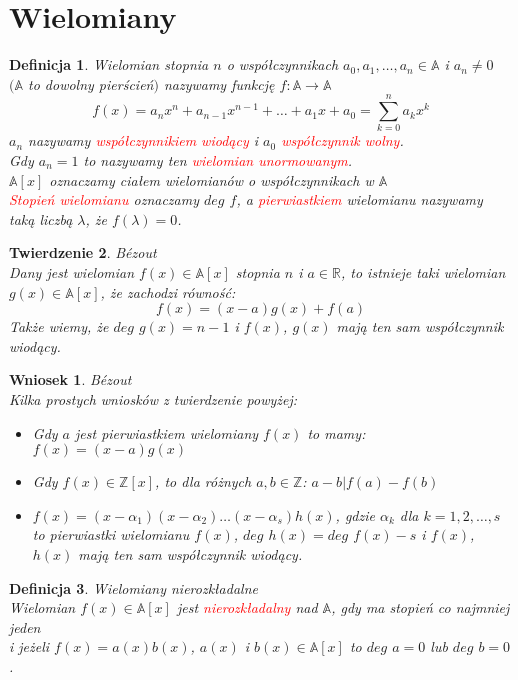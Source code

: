 \documentclass[10pt,a4paper]{article}
\newtheorem{theorem}{Twierdzenie}[section]
\newtheorem{corollary}{Wniosek}[theorem]
\newtheorem{defi}[theorem]{Definicja}
\newcommand{\Z}{\mathbb{Z}}
\newcommand{\R}{\mathbb{R}}
\newcommand{\A}{\mathbb{A}}
\begin{document}
\section{Wielomiany}
\begin{defi}
\color{black}
	Wielomian stopnia $n$ o współczynnikach $a_0,a_1,\ldots,a_n \in \A$ i $a_n \neq 0$ \\ $(\A$ to dowolny pierścień$)$ nazywamy funkcję $f:\A \rightarrow \A$
	$$f(x)=a_nx^n+a_{n-1}x^{n-1}+\ldots+a_1x+a_0 = \sum_{k=0}^{n}a_kx^k$$
	$a_n$ nazywamy \textcolor{red}{współczynnikiem wiodący} i $a_0$ \textcolor{red}{współczynnik wolny}. 
	\\ Gdy $a_n=1$ to nazywamy ten \textcolor{red}{wielomian unormowanym}.  
	\\ $\A[x]$ oznaczamy ciałem wielomianów o współczynnikach w $\A$
	\\
	\textcolor{red}{Stopień wielomianu} oznaczamy $deg$ $f$, a \textcolor{red}{pierwiastkiem} wielomianu nazywamy taką liczbą $\lambda$, że $f(\lambda)=0$.
\end{defi}
\begin{theorem}{Bézout}
	\\
	\color{black}
	Dany jest wielomian $f(x) \in \A[x]$ stopnia $n$ i $a \in \R$, to istnieje taki wielomian $g(x) \in \A[x]$, że zachodzi równość: 
	$$f(x)=(x-a)g(x)+f(a)$$
	Także wiemy, że $deg$ $g(x) = n-1$ i $f(x)$, $g(x)$ mają ten sam współczynnik wiodący. 
\end{theorem}
\begin{corollary}{Bézout}
	\\
	\color{black}
	Kilka prostych wniosków z twierdzenie powyżej:
	\begin{itemize}
		\item 
		Gdy $a$ jest pierwiastkiem wielomiany $f(x)$ to mamy: $f(x)=(x-a)g(x)$
		\item
		Gdy $f(x) \in \Z[x]$, to dla różnych $a,b \in \Z$: $a-b|f(a)-f(b)$
		\item
		$f(x)=(x-\alpha_1)(x-\alpha_2)\ldots(x-\alpha_s)h(x)$, gdzie $\alpha_k$ dla $k=1,2,\ldots,s$ to pierwiastki wielomianu $f(x)$, $deg$ $h(x)=deg$ $f(x)-s$ i $f(x)$, $h(x)$ mają ten sam współczynnik wiodący. 
	\end{itemize}
\end{corollary}
\begin{defi}{Wielomiany nierozkładalne}
	\\ \color{black}
	Wielomian $f(x) \in \A[x]$ jest \textcolor{red}{nierozkładalny} nad $\A$, gdy ma stopień co najmniej jeden 
	\\ i jeżeli $f(x)=a(x)b(x)$, $a(x)$ i $b(x) \in \A[x]$ to $deg$ $a=0$ lub $deg$ $b=0$.
\end{defi}
\end{document}
